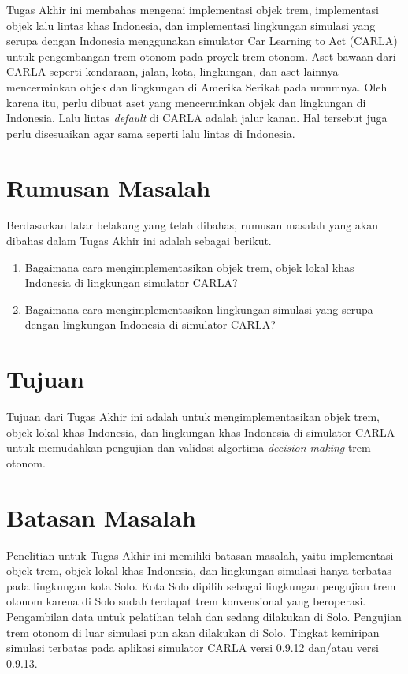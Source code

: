Tugas Akhir ini membahas mengenai implementasi objek trem, implementasi objek
lalu lintas khas Indonesia, dan implementasi lingkungan simulasi yang serupa
dengan Indonesia menggunakan simulator Car Learning to Act (CARLA) untuk
pengembangan trem otonom pada proyek trem otonom. Aset bawaan dari CARLA seperti
kendaraan, jalan, kota, lingkungan, dan aset lainnya mencerminkan objek dan
lingkungan di Amerika Serikat pada umumnya. Oleh karena itu, perlu dibuat aset
yang mencerminkan objek dan lingkungan di Indonesia. Lalu lintas
\textit{default} di CARLA adalah jalur kanan. Hal tersebut juga perlu
disesuaikan agar sama seperti lalu lintas di Indonesia.

\section{Rumusan Masalah}

Berdasarkan latar belakang yang telah dibahas, rumusan masalah yang akan dibahas
dalam Tugas Akhir ini adalah sebagai berikut.

\begin{enumerate}

    \item Bagaimana cara mengimplementasikan objek trem, objek lokal khas
    Indonesia di lingkungan simulator CARLA?

    \item Bagaimana cara mengimplementasikan lingkungan simulasi yang serupa
    dengan lingkungan Indonesia di simulator CARLA?

\end{enumerate}

\section{Tujuan}

Tujuan dari Tugas Akhir ini adalah untuk mengimplementasikan objek trem, objek
lokal khas Indonesia, dan lingkungan khas Indonesia di simulator CARLA untuk
memudahkan pengujian dan validasi algortima \textit{decision making} trem
otonom.

\section{Batasan Masalah}

Penelitian untuk Tugas Akhir ini memiliki batasan masalah, yaitu implementasi
objek trem, objek lokal khas Indonesia, dan lingkungan simulasi hanya terbatas
pada lingkungan kota Solo. Kota Solo dipilih sebagai lingkungan pengujian trem
otonom karena di Solo sudah terdapat trem konvensional yang beroperasi.
Pengambilan data untuk pelatihan telah dan sedang dilakukan di Solo. Pengujian
trem otonom di luar simulasi pun akan dilakukan di Solo. Tingkat kemiripan
simulasi terbatas pada aplikasi simulator CARLA versi 0.9.12 dan/atau versi
0.9.13.

